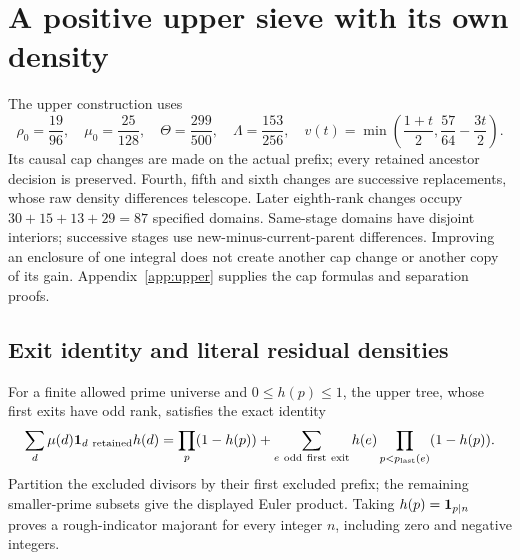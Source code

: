 \section{A positive upper sieve with its own density}
\label{sec:current-upper}

The upper construction uses
\[
 \rho_0=\frac{19}{96},\quad \mu_0=\frac{25}{128},\quad
 \Theta=\frac{299}{500},\quad \Lambda=\frac{153}{256},\quad
 v(t)=\min\left(\frac{1+t}{2},\frac{57}{64}-\frac{3t}{2}\right).
\]
Its causal cap changes are made on the actual prefix; every retained
ancestor decision is preserved.  Fourth, fifth and sixth changes are
successive replacements, whose raw density differences telescope.
Later eighth-rank changes occupy $30+15+13+29=87$ specified domains.
Same-stage domains have disjoint interiors; successive stages use
new-minus-current-parent differences.  Improving an enclosure of one
integral does not create another cap change or another copy of its gain.
Appendix~\ref{app:upper} supplies the cap formulas and separation proofs.

\subsection{Exit identity and literal residual densities}

For a finite allowed prime universe and $0\le h(p)\le1$, the upper
tree, whose first exits have odd rank, satisfies the exact identity
\begin{equation}
 \sum_d\mu(d){\bf1}_{d\ {\rm retained}}h(d)
 =\prod_p(1-h(p))
   +\sum_{e\ {\rm odd\ first\ exit}}h(e)
                      \prod_{p<p_{\rm last}(e)}(1-h(p)).
 \label{eq:current-upper-exit}
\end{equation}
Partition the excluded divisors by their first excluded prefix; the
remaining smaller-prime subsets give the displayed Euler product.
Taking $h(p)={\bf1}_{p\mid n}$ proves a rough-indicator majorant for
every integer $n$, including zero and negative integers.

